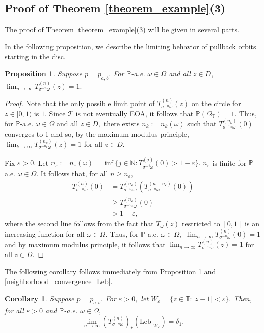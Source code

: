\documentclass[12pt,reqno]{amsart}
\numberwithin{theorem}{section}
\newtheorem{proposition}[theorem]{Proposition}%
\newtheorem{corollary}[theorem]{Corollary}
\begin{document}
\subsection{Proof of Theorem \ref{theorem_example}(3)}

The proof of Theorem \ref{theorem_example}(3) will be given in several parts.

In the following proposition, we describe the limiting behavior of pullback orbits starting in the disc.
\begin{proposition}\label{example_limit_pts_disc}
Suppose $p=p_{a,b}.$ For $\mathbb{P}$-a.e. $\omega\in\Omega$ and all $z\in D,$ $\lim_{n\to\infty}T_{\sigma^{-n}\omega}^{(n)}(z)=1.$

\end{proposition}
\begin{proof}
    

        Note that the only possible limit point of $T_{\sigma^{-n}\omega}^{(n)}(z)$ on the circle for $z\in[0,1)$ is $1.$ Since $\mathcal{T}$ is not eventually EOA, it follows that $\mathbb{P}(\Omega_{\mathbb{T}})=1.$ Thus, for $\mathbb{P}$-a.e. $\omega\in\Omega$ and all $z\in D,$ there exists $n_{k}:=n_k(\omega)$ such that $T_{\sigma^{-n_k}\omega}^{(n_k)}(0)$ converges to 1 and so, by the maximum modulus principle, $\lim_{k\to\infty}T_{\sigma^{-n_k}\omega}^{(n_k)}(z)=1$ for all $z\in D.$

        Fix $\varepsilon>0.$ Let $n_{\varepsilon}:=n_{\varepsilon}(\omega)=\inf\{j\in\mathbb{N}:T_{\sigma^{-j}\omega}^{(j)}(0)>1-\varepsilon\}.$ $n_{\varepsilon}$ is finite for $\mathbb{P}$-a.e. $\omega\in\Omega.$ It follows that, for all $n\ge n_{\varepsilon},$ \begin{align*}
         T_{\sigma^{-n}\omega}^{(n)}(0)&=T_{\sigma^{-n_{\varepsilon}}\omega}^{(n_{\varepsilon})}(T_{\sigma^{-n}\omega}^{(n-n_{\varepsilon})}(0))\\&\ge T_{\sigma^{-n_{\varepsilon}}\omega}^{(n_{\varepsilon})}(0)\\&>1-\varepsilon,
     \end{align*} where the second line follows from the fact that $T_{\omega}(z)$ restricted to $[0,1]$ is an increasing function for all $\omega\in\Omega.$ Thus, for $\mathbb{P}$-a.e. $\omega\in\Omega,$ $\lim_{n\to\infty}T_{\sigma^{-n}\omega}^{(n)}(0)=1$ and by maximum modulus principle, it follows that  $\lim_{n\to\infty}T_{\sigma^{-n}\omega}^{(n)}(z)=1$ for all $z\in D.$ 
\end{proof}

The following corollary follows immediately from Proposition \ref{example_limit_pts_disc} and \ref{neighborhood_convergence_Leb}.
\begin{corollary}
    Suppose $p=p_{a,b}.$ For $\varepsilon>0,$ let $W_{\varepsilon}=\{z\in\mathbb{T}:|z-1|<\varepsilon\}.$ Then, for all $\varepsilon>0$ and $\mathbb{P}$-a.e. $\omega\in\Omega,$ $$\lim_{n\to\infty}(T_{\sigma^{-n}\omega}^{(n)})_{*}(\text{Leb}|_{W_{\varepsilon}})=\delta_1.$$
\end{corollary}
\end{document}
